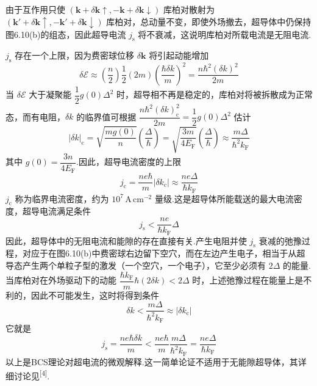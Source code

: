 由于互作用只使 $(\boldsymbol{k}+\delta\boldsymbol{k}\uparrow,-\boldsymbol{k}+\delta\boldsymbol{k}\downarrow)$ 库柏对散射为 $(\boldsymbol{k}'+\delta\boldsymbol{k}\uparrow,-\boldsymbol{k}'+\delta\boldsymbol{k}\downarrow)$ 库柏对，总动量不变，即使外场撤去，超导体中仍保持图6.10(b)的组态，因此超导电流 $j_{\mathrm{s}}$ 将不衰减，这说明库柏对所载电流是无阻电流.

$j_{\mathrm{s}}$ 存在一个上限，因为费密球位移 $\delta\boldsymbol{k}$ 将引起动能增加
\begin{equation*}
  \delta\mathcal{E}\approx\left(\frac{n}{2}\right)\frac{1}{2}(2m)
  \left(\frac{\hbar\delta k}{m}\right)^{2}
  =\frac{n\hbar^{2}(\delta k)^{2}}{2m}
\end{equation*}
当 $\delta\mathcal{E}$ 大于凝聚能 $\dfrac{1}{2}g(0)\Delta^{2}$ 时，超导相不再是稳定的，库柏对将被拆散成为正常态，而有电阻，$\delta k$ 的临界值可根据 $\dfrac{n\hbar^{2}(\delta k)_{\mathrm{c}}^{2}}{2m}=\dfrac{1}{2}g(0)\Delta^{2}$ 估计
\begin{equation*}
  |\delta k|_{\mathrm{c}}=\sqrt{\frac{mg(0)}{n}}\left(\frac{\Delta}{\hbar}\right)
  =\sqrt{\frac{3m}{4E_{\mathrm{F}}}}\left(\frac{\Delta}{\hbar}\right)
  \approx\frac{m\Delta}{\hbar^{2}k_{\mathrm{F}}}
\end{equation*}
其中 $g(0)=\dfrac{3n}{4E_{\mathrm{F}}}$.因此，超导电流密度的上限
\begin{equation}
  j_{\mathrm{c}}=\frac{ne\hbar}{m}|\delta k_{\mathrm{c}}|
  \approx\frac{ne\Delta}{\hbar k_{\mathrm{F}}}
\end{equation}
$j_{\mathrm{c}}$ 称为临界电流密度，约为 $10^{7}\,\mathrm{A\,cm^{-2}}$ 量级.这是超导体所能载送的最大电流密度，超导电流满足条件
\begin{equation}
  j_{\mathrm{s}}<\frac{ne}{\hbar k_{\mathrm{F}}}\Delta
\end{equation}
因此，超导体中的无阻电流和能隙的存在直接有关.产生电阻并使 $j_{\mathrm{s}}$ 衰减的弛豫过程，对应于在图6.10(b)中费密球右边留下空穴，而在左边产生电子，相当于从超导态产生两个单粒子型的激发（一个空穴，一个电子），它至少必须有 $2\Delta$ 的能量.当库柏对在外场驱动下的动能 $\dfrac{\hbar k_{\mathrm{F}}}{m}\hbar(2\delta k)<2\Delta$ 时，上述弛豫过程在能量上是不利的，因此不可能发生，这时将得到条件
\begin{equation*}
  \delta k<\frac{m\Delta}{\hbar^{2}k_{\mathrm{F}}}\approx|\delta k_{\mathrm{c}}|
\end{equation*}
它就是
\begin{equation*}
  j_{\mathrm{s}}=\frac{ne\hbar\delta k}{m}
  <\frac{ne\hbar}{m}\frac{m\Delta}{\hbar^{2}k_{\mathrm{F}}}
  =\frac{ne\Delta}{\hbar k_{\mathrm{F}}}
\end{equation*}
以上是BCS理论对超电流的微观解释.这一简单论证不适用于无能隙超导体，其详细讨论见\textsuperscript{[4]}.

